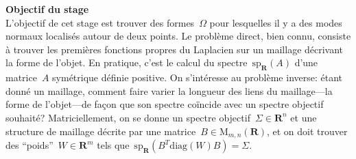 \documentclass[a4paper,11pt]{article}
\begin{document}
{\bf Objectif du stage}\\
L'objectif de cet stage est trouver des formes~$\Omega$ pour lesquelles il y a
des modes normaux localisés autour de deux points.
Le problème direct, bien connu, consiste à trouver
les premières fonctions propres du Laplacien sur un maillage décrivant la forme
de l'objet.  En pratique, c'est le calcul du
spectre~$\mathrm{sp}_{\mathbf{R}}(A)$ d'une matrice~$A$ symétrique définie
positive.
On s'intéresse au problème inverse: étant donné un maillage, comment faire
varier la longueur des liens du maillage---la forme de l'objet---de façon que
son spectre coïncide avec un spectre objectif souhaité?
Matriciellement, on se donne un spectre
objectif~$\Sigma\in\mathbf{R}^n$ et une structure de maillage décrite par une
matrice~$B\in\mathrm{M}_{m,n}(\mathbf{R})$, et on doit trouver des
``poids''~$W\in\mathbf{R}^m$ tels
que~$\mathrm{sp}_\mathbf{R}\left(B^T\mathrm{diag}(W)B\right)=\Sigma$.
\end{document}

